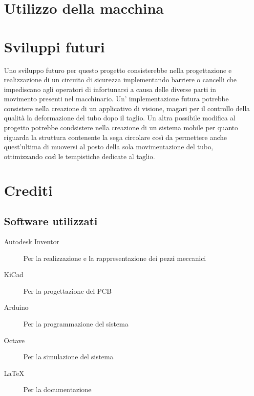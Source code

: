 \documentclass{report}
\begin{document}
\chapter{Utilizzo della macchina}


\chapter{Sviluppi futuri}
  Uno sviluppo futuro per questo progetto consisterebbe nella progettazione e realizzazione di un circuito di sicurezza implementando barriere o cancelli che impediscano agli operatori di infortunarsi a causa delle diverse parti in movimento presenti nel macchinario.
  Un' implementazione futura potrebbe consistere nella creazione di un applicativo di visione, magari per il controllo della qualità  la deformazione del tubo dopo il taglio.
  Un altra possibile modifica al progetto potrebbe condsistere nella creazione di un sistema mobile per quanto riguarda la struttura contenente la sega circolare così da permettere anche quest'ultima di muoversi al posto della sola movimentazione del tubo, ottimizzando così le tempistiche dedicate al taglio.

\chapter{Crediti}
\section{Software utilizzati}
\begin{description}
\item[Autodesk Inventor]Per la realizzazione e la rappresentazione dei
  pezzi meccanici
\item[KiCad]Per la progettazione del PCB
\item[Arduino]Per la programmazione del sistema
\item[Octave]Per la simulazione del sistema
\item[\LaTeX]Per la documentazione
\end{description}




\end{document}
